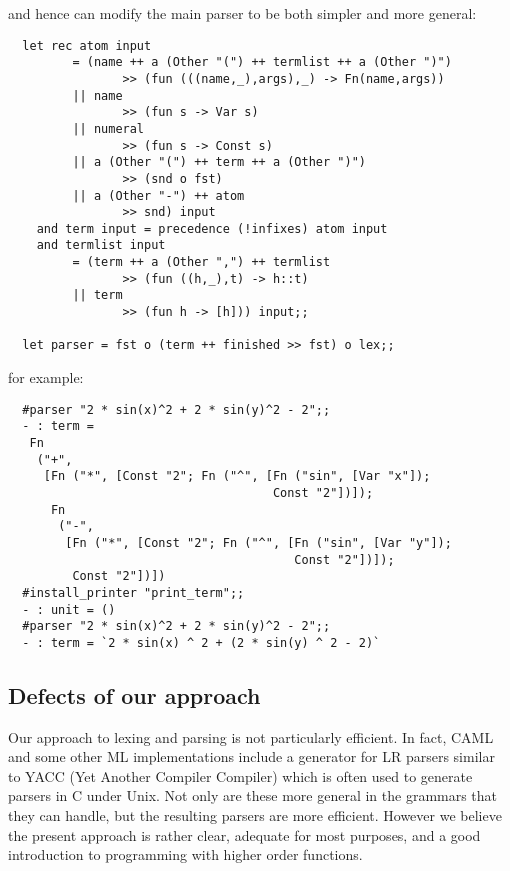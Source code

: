 \noindent and hence can modify the main parser to be both simpler and more
general:

\begin{boxed}\begin{lstlisting}
  let rec atom input
         = (name ++ a (Other "(") ++ termlist ++ a (Other ")")
                >> (fun (((name,_),args),_) -> Fn(name,args))
         || name
                >> (fun s -> Var s)
         || numeral
                >> (fun s -> Const s)
         || a (Other "(") ++ term ++ a (Other ")")
                >> (snd o fst)
         || a (Other "-") ++ atom
                >> snd) input
    and term input = precedence (!infixes) atom input
    and termlist input
         = (term ++ a (Other ",") ++ termlist
                >> (fun ((h,_),t) -> h::t)
         || term
                >> (fun h -> [h])) input;;

  let parser = fst o (term ++ finished >> fst) o lex;;
\end{lstlisting}\end{boxed}

\noindent for example:

\begin{boxed}\begin{verbatim}
  #parser "2 * sin(x)^2 + 2 * sin(y)^2 - 2";;
  - : term =
   Fn
    ("+",
     [Fn ("*", [Const "2"; Fn ("^", [Fn ("sin", [Var "x"]);
                                     Const "2"])]);
      Fn
       ("-",
        [Fn ("*", [Const "2"; Fn ("^", [Fn ("sin", [Var "y"]);
                                        Const "2"])]);
         Const "2"])])
  #install_printer "print_term";;
  - : unit = ()
  #parser "2 * sin(x)^2 + 2 * sin(y)^2 - 2";;
  - : term = `2 * sin(x) ^ 2 + (2 * sin(y) ^ 2 - 2)`
\end{verbatim}\end{boxed}

\subsection{Defects of our approach}

Our approach to lexing and parsing is not particularly efficient. In fact,
CAML and some other ML implementations include a generator for LR parsers
similar to YACC (Yet Another Compiler Compiler) which is often used to generate
parsers in C under Unix. Not only are these more general in the grammars that
they can handle, but the resulting parsers are more efficient. However we
believe the present approach is rather clear, adequate for most purposes, and a
good introduction to programming with higher order functions.

